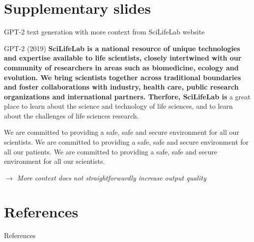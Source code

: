 \documentclass[10pt]{beamer}
\newcommand{\remark}[1]{{\par \color{scGrape} \ensuremath{\rightarrow} \emph{#1}}}
\begin{document}
\section{Supplementary slides}

\begin{frame}{GPT-2 text generation with more context from SciLifeLab website}
	
	\begin{alertblock}{GPT-2 (2019) }
		\small
		\textbf{SciLifeLab is a national resource of unique technologies and expertise available to life scientists, closely intertwined with our community of researchers in areas such as biomedicine, ecology and evolution. We bring scientists together across traditional boundaries and foster collaborations with industry, health care, public research organizations and international partners. Therfore, SciLifeLab is}  a great place to learn about the science and technology of life sciences, and to learn about the challenges of life sciences research.
		
		We are committed to providing a safe, safe and secure environment for all our scientists. We are committed to providing a safe, safe and secure environment for all our patients. We are committed to providing a safe, safe and secure environment for all our scientists.
	\end{alertblock}
	\remark{More context does not straightforwardly increase output quality}
\end{frame}


\section{References}
\begin{frame}[allowframebreaks]{References}
\begingroup
\renewcommand*{\bibfont}{\footnotesize} 
\printbibliography[heading=none]
\endgroup
\end{frame}
\end{document}
